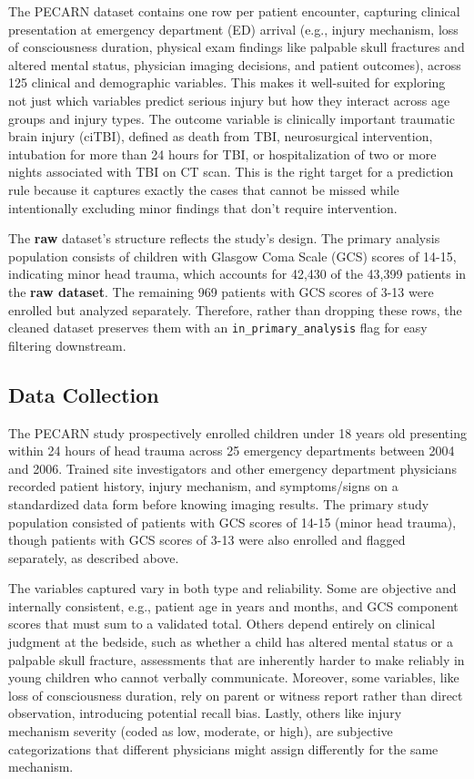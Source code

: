 \documentclass[11pt,letterpaper]{article}
\begin{document}
The PECARN dataset contains one row per patient encounter, capturing clinical presentation at emergency department (ED) arrival (e.g., injury mechanism, loss of consciousness duration, physical exam findings like palpable skull fractures and altered mental status, physician imaging decisions, and patient outcomes), across 125 clinical and demographic variables. This makes it well-suited for exploring not just which variables predict serious injury but how they interact across age groups and injury types. The outcome variable is clinically important traumatic brain injury (ciTBI), defined as death from TBI, neurosurgical intervention, intubation for more than 24 hours for TBI, or hospitalization of two or more nights associated with TBI on CT scan. This is the right target for a prediction rule because it captures exactly the cases that cannot be missed while intentionally excluding minor findings that don't require intervention.

The \textbf{raw} dataset's structure reflects the study's design. The primary analysis population consists of children with Glasgow Coma Scale (GCS) scores of 14-15, indicating minor head trauma, which accounts for 42,430 of the 43,399 patients in the \textbf{raw dataset}. The remaining 969 patients with GCS scores of 3-13 were enrolled but analyzed separately. Therefore, rather than dropping these rows, the cleaned dataset preserves them with an \texttt{in\_primary\_analysis} flag for easy filtering downstream.

\subsection{Data Collection}\label{data-collection}

The PECARN study prospectively enrolled children under 18 years old presenting within 24 hours of head trauma across 25 emergency departments between 2004 and 2006. Trained site investigators and other emergency department physicians recorded patient history, injury mechanism, and symptoms/signs on a standardized data form before knowing imaging results. The primary study population consisted of patients with GCS scores of 14-15 (minor head trauma), though patients with GCS scores of 3-13 were also enrolled and flagged separately, as described above.

The variables captured vary in both type and reliability. Some are objective and internally consistent, e.g., patient age in years and months, and GCS component scores that must sum to a validated total. Others depend entirely on clinical judgment at the bedside, such as whether a child has altered mental status or a palpable skull fracture, assessments that are inherently harder to make reliably in young children who cannot verbally communicate. Moreover, some variables, like loss of consciousness duration, rely on parent or witness report rather than direct observation, introducing potential recall bias. Lastly, others like injury mechanism severity (coded as low, moderate, or high), are subjective categorizations that different physicians might assign differently for the same mechanism.
\end{document}
